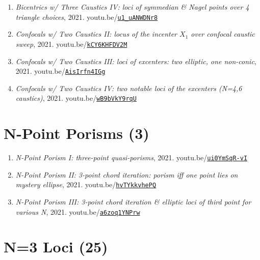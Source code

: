 \documentclass[12pt]{article}
\begin{document}
\begin{enumerate}[resume]
\item \textit{Bicentrics w/ Three Caustics IV: loci of symmedian \& Nagel points over 4 triangle choices}, 2021. youtu.be/\href{https://youtu.be/u1_uANWDNr8}{\nolinkurl{u1\_uANWDNr8}}
\item \textit{Confocals w/ Two Caustics II: locus of the incenter $X_{1}$ over confocal caustic sweep}, 2021. youtu.be/\href{https://youtu.be/kCY6KHFDV2M}{\nolinkurl{kCY6KHFDV2M}}
\item \textit{Confocals w/ Two Caustics III: loci of excenters: two elliptic, one non-conic}, 2021. youtu.be/\href{https://youtu.be/AisIrfn4IGg}{\nolinkurl{AisIrfn4IGg}}
\item \textit{Confocals w/ Two Caustics IV: two notable loci of the excenters (N=4,6 caustics)}, 2021. youtu.be/\href{https://youtu.be/wB9bVkY9rqU}{\nolinkurl{wB9bVkY9rqU}}
\end{enumerate}

\section{N-Point Porisms (3)}

\begin{enumerate}[resume]
\item \textit{N-Point Porism I: three-point quasi-porisms}, 2021. youtu.be/\href{https://youtu.be/ui0YmSqR-vI}{\nolinkurl{ui0YmSqR-vI}}
\item \textit{N-Point Porism II: 3-point chord iteration: porism iff one point lies on mystery ellipse}, 2021. youtu.be/\href{https://youtu.be/hvTYkkvhePQ}{\nolinkurl{hvTYkkvhePQ}}
\item \textit{N-Point Porism III: 3-point chord iteration \& elliptic loci of third point for various N}, 2021. youtu.be/\href{https://youtu.be/a6zoq1YNPrw}{\nolinkurl{a6zoq1YNPrw}}
\end{enumerate}

\section{N=3 Loci (25)}
\end{document}
